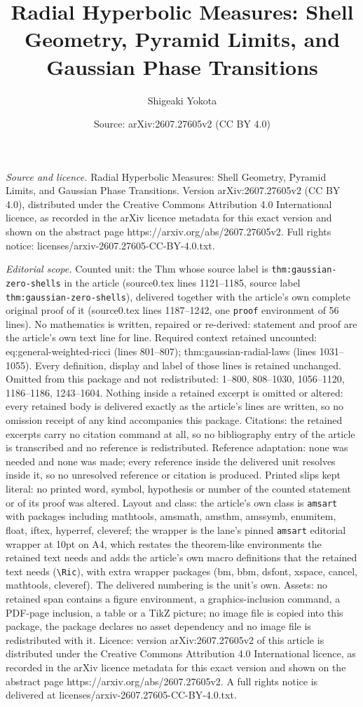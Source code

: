 \documentclass[10pt,a4paper]{amsart}
\title[Radial Hyperbolic Measures: Shell Geometry, Pyramid Limits, ]{Radial Hyperbolic Measures: Shell Geometry, Pyramid Limits, and Gaussian Phase Transitions}
\author{Shigeaki Yokota}
\date{Source: arXiv:2607.27605v2 (CC BY 4.0)}
\begin{document}
\maketitle

\noindent\emph{Source and licence.} Radial Hyperbolic Measures: Shell Geometry, Pyramid Limits, and Gaussian Phase Transitions. Version arXiv:2607.27605v2 (CC BY 4.0), distributed under the Creative Commons Attribution 4.0 International licence, as recorded in the arXiv licence metadata for this exact version and shown on the abstract page https://arxiv.org/abs/2607.27605v2. Full rights notice: licenses/arxiv-2607.27605-CC-BY-4.0.txt.\par\smallskip

\noindent\textit{Editorial scope.} Counted unit: the Thm whose source label is \texttt{thm:gaussian-zero-shells} in the article (source0.tex lines 1121--1185, source label \texttt{thm:gaussian-zero-shells}), delivered together with the article's own complete original proof of it (source0.tex lines 1187--1242, one \texttt{proof} environment of 56 lines). No mathematics is written, repaired or re-derived: statement and proof are the article's own text line for line. Required context retained uncounted: eq:general-weighted-ricci (lines 801--807); thm:gaussian-radial-laws (lines 1031--1055). Every definition, display and label of those lines is retained unchanged. Omitted from this package and not redistributed: 1--800, 808--1030, 1056--1120, 1186--1186, 1243--1604. Nothing inside a retained excerpt is omitted or altered: every retained body is delivered exactly as the article's lines are written, so no omission receipt of any kind accompanies this package. Citations: the retained excerpts carry no citation command at all, so no bibliography entry of the article is transcribed and no reference is redistributed. Reference adaptation: none was needed and none was made; every reference inside the delivered unit resolves inside it, so no unresolved reference or citation is produced. Printed slips kept literal: no printed word, symbol, hypothesis or number of the counted statement or of its proof was altered. Layout and class: the article's own class is \texttt{amsart} with packages including mathtools, amsmath, amsthm, amssymb, enumitem, float, iftex, hyperref, cleveref; the wrapper is the lane's pinned \texttt{amsart} editorial wrapper at 10pt on A4, which restates the theorem-like environments the retained text needs and adds the article's own macro definitions that the retained text needs (\texttt{\textbackslash Ric}), with extra wrapper packages (bm, bbm, dsfont, xspace, cancel, mathtools, cleveref). The delivered numbering is the unit's own. Assets: no retained span contains a figure environment, a graphics-inclusion command, a PDF-page inclusion, a table or a TikZ picture; no image file is copied into this package, the package declares no asset dependency and no image file is redistributed with it. Licence: version arXiv:2607.27605v2 of this article is distributed under the Creative Commons Attribution 4.0 International licence, as recorded in the arXiv licence metadata for this exact version and shown on the abstract page https://arxiv.org/abs/2607.27605v2. A full rights notice is delivered at licenses/arxiv-2607.27605-CC-BY-4.0.txt. 
\end{document}
